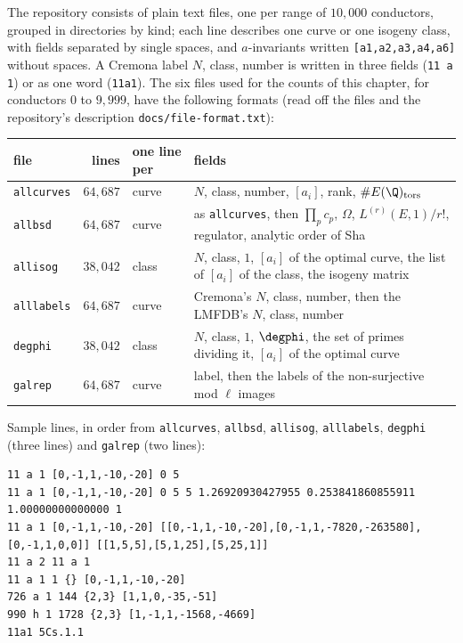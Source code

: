 \begin{sloppypar}
\begin{definition}\label{def:computation:ecdata-files}
The repository consists of plain text files, one per range of $10{,}000$ conductors, grouped in directories by kind; each line describes one
curve or one isogeny class, with fields separated by single spaces, and $a$-invariants written \texttt{[a1,a2,a3,a4,a6]} without spaces. A
Cremona label $N$, class, number is written in three fields (\texttt{11 a 1}) or as one word (\texttt{11a1}). The six files used for the counts of
this chapter, for conductors $0$ to $9{,}999$, have the following formats (read off the files and the repository's description
\texttt{docs/file-format.txt}):
\begin{center}\small
\begin{tabular}{lrlp{8.2cm}}
\toprule
file & lines & one line per & fields\\
\midrule
\texttt{allcurves} & $64{,}687$ & curve & $N$, class, number, $[a_i]$, rank, $\#E(\Q)_{\mathrm{tors}}$\\
\texttt{allbsd} & $64{,}687$ & curve & as \texttt{allcurves}, then $\prod_pc_p$, $\Omega$, $L^{(r)}(E,1)/r!$, regulator, analytic order of Sha\\
\texttt{allisog} & $38{,}042$ & class & $N$, class, $1$, $[a_i]$ of the optimal curve, the list of $[a_i]$ of the class, the isogeny matrix\\
\texttt{alllabels} & $64{,}687$ & curve & Cremona's $N$, class, number, then the LMFDB's $N$, class, number\\
\texttt{degphi} & $38{,}042$ & class & $N$, class, $1$, $\degphi$, the set of primes dividing it, $[a_i]$ of the optimal curve\\
\texttt{galrep} & $64{,}687$ & curve & label, then the labels of the non-surjective mod $\ell$ images\\
\bottomrule
\end{tabular}
\end{center}
Sample lines, in order from \texttt{allcurves}, \texttt{allbsd}, \texttt{allisog}, \texttt{alllabels}, \texttt{degphi} (three lines) and
\texttt{galrep} (two lines):
\begin{lstlisting}
11 a 1 [0,-1,1,-10,-20] 0 5
11 a 1 [0,-1,1,-10,-20] 0 5 5 1.26920930427955 0.253841860855911 1.00000000000000 1
11 a 1 [0,-1,1,-10,-20] [[0,-1,1,-10,-20],[0,-1,1,-7820,-263580],[0,-1,1,0,0]] [[1,5,5],[5,1,25],[5,25,1]]
11 a 2 11 a 1
11 a 1 1 {} [0,-1,1,-10,-20]
726 a 1 144 {2,3} [1,1,0,-35,-51]
990 h 1 1728 {2,3} [1,-1,1,-1568,-4669]
11a1 5Cs.1.1

\end{lstlisting}
\end{definition}
\end{sloppypar}

